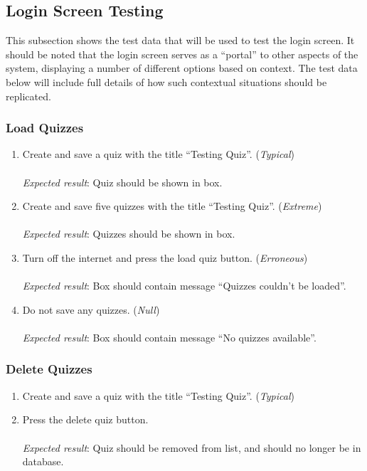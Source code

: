 \subsection{Login Screen Testing} %
\label{sub:login_screen_testing}
This subsection shows the test data that will be used to test the login screen. It should be noted that the login screen serves as a ``portal'' to other aspects of the system, displaying a number of different options based on context. The test data below will include full details of how such contextual situations should be replicated.

\subsubsection{Load Quizzes} %
\label{ssub:load_quizzes}
\begin{enumerate}[leftmargin=*]
\item Create and save a quiz with the title ``Testing Quiz''. (\textit{Typical})\\\\
\textit{Expected result}: Quiz should be shown in box.\\
\item Create and save five quizzes with the title ``Testing Quiz''. (\textit{Extreme})\\\\
\textit{Expected result}: Quizzes should be shown in box.\\
\item Turn off the internet and press the load quiz button. (\textit{Erroneous})\\\\
\textit{Expected result}: Box should contain message ``Quizzes couldn't be loaded''.\\
\item Do not save any quizzes. (\textit{Null})\\\\
\textit{Expected result}: Box should contain message ``No quizzes available''.
\end{enumerate}

\subsubsection{Delete Quizzes} %
\label{ssub:delete_quizzes}
\begin{enumerate}[leftmargin=*]
\item Create and save a quiz with the title ``Testing Quiz''. (\textit{Typical})
\item Press the delete quiz button.\\\\
\textit{Expected result}: Quiz should be removed from list, and should no longer be in database.
\end{enumerate}

